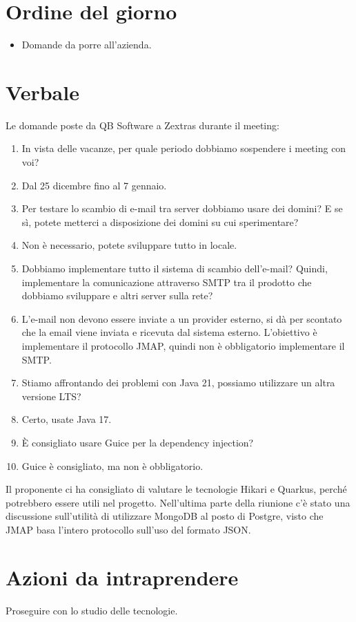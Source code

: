 \documentclass[12pt]{article}
\begin{document}
    \section{Ordine del giorno}
    \begin{itemize}
    	\item Domande da porre all'azienda.
    \end{itemize}
    
    \section{Verbale}
    Le domande poste da QB Software a Zextras durante il meeting:

    \newcommand{\answer}{\item[\textbf{A:}]}
        
        \begin{enumerate}[label=\textbf{Q\arabic*:}]
            \item In vista delle vacanze, per quale periodo dobbiamo sospendere i meeting con voi?
            \answer Dal 25 dicembre fino al 7 gennaio.

            \item Per testare lo scambio di e-mail tra server dobbiamo usare dei domini? E se sì, potete metterci a disposizione dei domini su cui sperimentare? 
            \answer Non è necessario, potete sviluppare tutto in locale.

            \item Dobbiamo implementare tutto il sistema di scambio dell'e-mail? Quindi, implementare la comunicazione attraverso SMTP tra il prodotto che dobbiamo sviluppare e altri server sulla rete?
            \answer L'e-mail non devono essere inviate a un provider esterno, si dà per scontato che la email viene inviata e ricevuta dal sistema esterno. L'obiettivo è implementare il protocollo JMAP, quindi non è obbligatorio implementare il SMTP.
            
            \item Stiamo affrontando dei problemi con Java 21, possiamo utilizzare un altra versione LTS? 
            \answer Certo, usate Java 17.
        
            \item È consigliato usare Guice per la dependency injection?
            \answer Guice è consigliato, ma non è obbligatorio.
        \end{enumerate}

        \noindent
        Il proponente ci ha consigliato di valutare le tecnologie Hikari e Quarkus, perché potrebbero essere utili nel progetto. Nell'ultima parte della riunione c'è stato una discussione sull'utilità di utilizzare MongoDB al posto di Postgre, visto che JMAP basa l'intero protocollo sull'uso del formato JSON.
    
    \section{Azioni da intraprendere}
    Proseguire con lo studio delle tecnologie.
\end{document}
